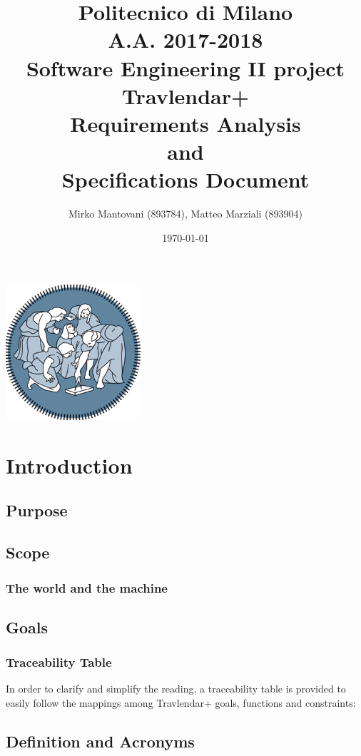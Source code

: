 \documentclass{article}
\author{Mirko Mantovani (893784), Matteo Marziali (893904)}
\date{\today}
\title{Politecnico di Milano
	\\A.A. 2017\@-\@2018
	\\Software Engineering II project \\ \textbf{Travlendar+}
	\\\textbf{R}equirements \textbf{A}nalysis \\and\\ \textbf{S}pecifications \textbf{D}ocument}
\begin{document}
\maketitle
\begin{center}
	\includegraphics[width=5cm]{polimi-logo}
\end{center}
\clearpage
{\hypersetup{hidelinks}\tableofcontents}
\clearpage

\section{Introduction}

\subsection{Purpose}



\newpage
\subsection{Scope}

\subsubsection{The world and the machine}

\clearpage
\subsection{Goals}

\subsubsection{Traceability Table}
In order to clarify and simplify the reading, a traceability table is provided to easily follow the mappings among Travlendar+ goals, functions and constraints: \\

\clearpage

\subsection{Definition and Acronyms}
\end{document}
